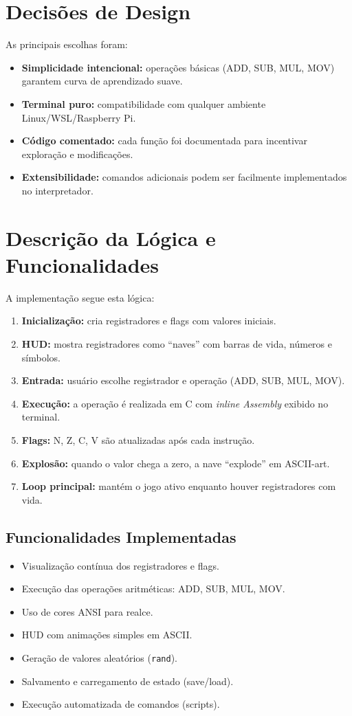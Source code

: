 \documentclass[12pt,a4paper]{report}
\begin{document}
\chapter{Decisões de Design}
As principais escolhas foram:
\begin{itemize}
    \item \textbf{Simplicidade intencional:} operações básicas (ADD, SUB, MUL, MOV) garantem curva de aprendizado suave.
    \item \textbf{Terminal puro:} compatibilidade com qualquer ambiente Linux/WSL/Raspberry Pi.
    \item \textbf{Código comentado:} cada função foi documentada para incentivar exploração e modificações.
    \item \textbf{Extensibilidade:} comandos adicionais podem ser facilmente implementados no interpretador.
\end{itemize}

\chapter{Descrição da Lógica e Funcionalidades}
A implementação segue esta lógica:
\begin{enumerate}
    \item \textbf{Inicialização:} cria registradores e flags com valores iniciais.
    \item \textbf{HUD:} mostra registradores como “naves” com barras de vida, números e símbolos.
    \item \textbf{Entrada:} usuário escolhe registrador e operação (ADD, SUB, MUL, MOV).
    \item \textbf{Execução:} a operação é realizada em C com \textit{inline Assembly} exibido no terminal.
    \item \textbf{Flags:} N, Z, C, V são atualizadas após cada instrução.
    \item \textbf{Explosão:} quando o valor chega a zero, a nave “explode” em ASCII-art.
    \item \textbf{Loop principal:} mantém o jogo ativo enquanto houver registradores com vida.
\end{enumerate}

\section*{Funcionalidades Implementadas}
\begin{itemize}
    \item Visualização contínua dos registradores e flags.
    \item Execução das operações aritméticas: ADD, SUB, MUL, MOV.
    \item Uso de cores ANSI para realce.
    \item HUD com animações simples em ASCII.
    \item Geração de valores aleatórios (\texttt{rand}).
    \item Salvamento e carregamento de estado (save/load).
    \item Execução automatizada de comandos (scripts).
\end{itemize}
\end{document}
